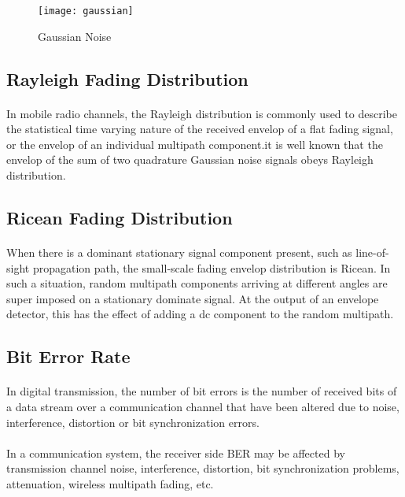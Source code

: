 \documentclass[14pt]{report}
\begin{document}
{\begin{figure}[ht]
\centering
\texttt{[image: gaussian]}
\label{fig:gas}
\caption{Gaussian Noise}
\end{figure}
\subsection{Rayleigh Fading Distribution}
\paragraph{} In mobile radio channels, the Rayleigh distribution is commonly used to describe the statistical time varying nature of the received envelop of a flat fading signal, or the envelop of an individual multipath component.it is well known that the envelop of the sum of two quadrature Gaussian noise signals obeys Rayleigh distribution. 
\subsection{Ricean Fading Distribution}
\paragraph{} When there is a dominant stationary signal component present, such as line-of-sight propagation path, the small-scale fading envelop distribution is Ricean. In such a situation, random multipath components arriving at different angles are super imposed on a stationary dominate signal. At the output of an envelope detector, this has the effect of adding a dc component to the random multipath. 
\subsection{Bit Error Rate}
\paragraph{} In digital transmission, the number of bit errors is the number of received bits of a data stream over a communication channel that have been altered due to noise, interference, distortion or bit synchronization errors.
\paragraph{} In a communication system, the receiver side BER may be affected by transmission channel noise, interference, distortion, bit synchronization problems, attenuation, wireless multipath fading, etc.
}
\end{document}
